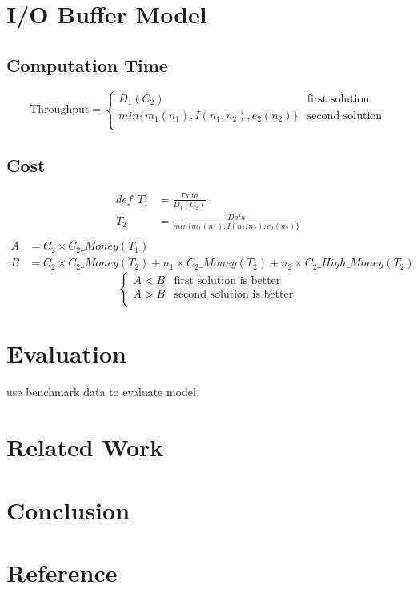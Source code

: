 \documentclass{article}
\begin{document}
\section{I/O Buffer Model}
	\subsection{Computation Time}
		\begin{equation*}
			\text{Throughput}=
			\begin{cases}
				D_1(C_2) & \text{first solution}\\
				min\{m_1(n_1),I(n_1,n_2),e_2(n_2)\} & \text{second solution}\\
			\end{cases}
		\end{equation*}
	\subsection{Cost}
		\begin{align*}
			def\ \ T_1&=\frac{Data}{D_1(C_2)}\\ T_2&=\frac{Data}{min\{m_1(n_1),I(n_1,n_2),e_2(n_2)\}}\\
		\end{align*}
		\begin{align*}
			A&=C_2\times C_2\_Money(T_1)\\
			B&=C_2\times C_2\_Money(T_2)+n_1\times C_2\_Money(T_2)+n_2\times C_2\_High\_Money(T_2)
		\end{align*}
		\begin{equation*}
			\begin{cases}
				A<B & \text{first solution is better}\\
				A>B & \text{second solution is better}\\
			\end{cases}
		\end{equation*}


\section{Evaluation}
use benchmark data to evaluate model.

\section{Related Work}


\section{Conclusion}


\section*{Reference}
\end{document}
